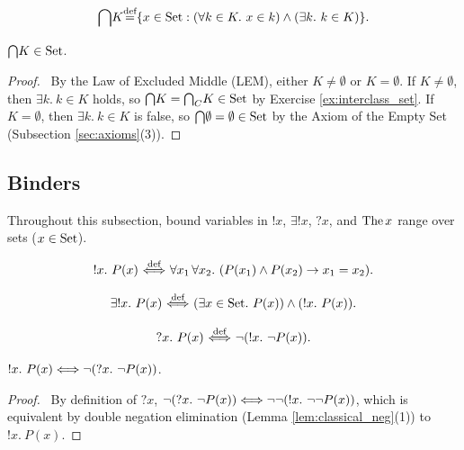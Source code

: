 \documentclass[10pt,a4paper]{article}
\renewcommand{\myprf}{\begin{proof}}
\renewcommand{\myqed}{\end{proof}}
\begin{document}
\begin{definition}
$${\bigcap} K {\stackrel{{\textrm{def}}}{=}} \{x \in {\textrm{Set}} : (\forall k\in K.\ x\in k)\land (\exists k.\ k\in K)\}.$$
\end{definition}

\begin{exercise}
${\bigcap} K \in {\textrm{Set}}$.
\end{exercise}
\myprf\ By the Law of Excluded Middle (LEM), either $K \neq \emptyset$ or $K = \emptyset$. If $K \neq \emptyset$, then $\exists k.\ k \in K$ holds, so ${\bigcap} K = {{\bigcap}_C} K \in {\textrm{Set}}$ by Exercise \ref{ex:interclass_set}. If $K = \emptyset$, then $\exists k.\ k \in K$ is false, so ${\bigcap} \emptyset = \emptyset \in {\textrm{Set}}$ by the Axiom of the Empty Set (Subsection \ref{sec:axioms}(3)). \myqed

\subsection{Binders}\label{sec:binders}
Throughout this subsection, bound variables in $!x$, $\exists !x$, $?x$, and ${\textrm{The\,}} x$ range over sets ($x \in {\textrm{Set}}$).
\begin{definition}\label{def:unique_q}
$$!x.\ P(x) \propdef \forall x_1\, \forall x_2.\ (P(x_1)\land P(x_2)\to x_1=x_2).$$
\end{definition}

\begin{definition}
$$\exists !x.\ P(x) {\stackrel{{\textrm{def}}}{\ \Longleftrightarrow\ }} (\exists x \in {\textrm{Set}}.\ P(x))\land(!x.\ P(x)).$$
\end{definition}

\begin{definition}\label{def:dual_q}
$$?x.\ P(x) {\stackrel{{\textrm{def}}}{\ \Longleftrightarrow\ }} \neg (!x.\ \neg P(x)).$$
\end{definition}

\begin{exercise}
$!x.\ P(x) \Longleftrightarrow \neg (?x.\ \neg P(x))$.
\end{exercise}
\myprf\ By definition of $?x$, $\neg (?x.\ \neg P(x)) \LRA \neg \neg (!x.\ \neg \neg P(x))$, which is equivalent by double negation elimination (Lemma \ref{lem:classical_neg}(1)) to $!x.\ P(x)$. \myqed
\end{document}
